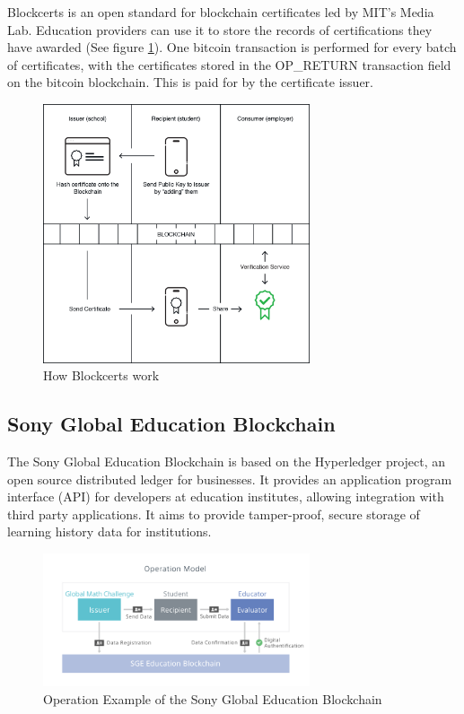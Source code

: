 Blockcerts is an open standard for blockchain certificates led by MIT’s Media Lab. Education providers can use it to store 
the records of certifications they have awarded (See figure \ref{fig:blockcerts}). One bitcoin transaction is performed for 
every batch of certificates, with the certificates stored in the OP\_RETURN transaction field on the bitcoin blockchain. 
This is paid for by the certificate issuer. \citep{blockcerts2018}

\begin{figure}[!ht] 
    \centering    
    \includegraphics[width=0.7\textwidth]{blockcerts}
    \caption[How Blockcerts work]
        {How Blockcerts work \citep{blockcerts2018}}
    \label{fig:blockcerts}
\end{figure}

\subsection{Sony Global Education Blockchain}%

The Sony Global Education Blockchain is based on the Hyperledger project, an open source distributed ledger 
for businesses. It provides an application program interface (API) for developers at education institutes, 
allowing integration with third party applications. It aims to provide tamper-proof, secure storage of 
learning history data for institutions. \citep{sonyged2017}

\begin{figure}[!ht] 
    \centering    
    \includegraphics[width=0.7\textwidth]{sonyged}
    \caption[Sony Global Education Blockchain]
        {Operation Example of the Sony Global Education Blockchain \citep{sonyged2017}}
    \label{fig:sonyged}
\end{figure}

